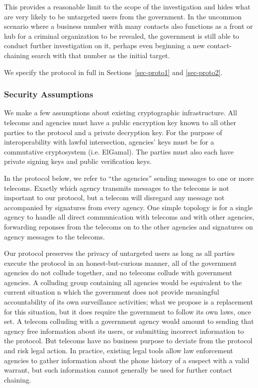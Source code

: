 This provides a reasonable limit to the scope of the investigation and hides what are very likely to be untargeted users from the government. In the uncommon scenario where a business number with many contacts also functions as a front or hub for a criminal organization to be revealed, the government is still able to conduct further investigation on it, perhaps even beginning a new contact-chaining search with that number as the initial target.

We specify the protocol in full in Sections~\ref{sec-proto1} and \ref{sec-proto2}.



\subsubsection{Security Assumptions}



We make a few assumptions about existing cryptographic infrastructure. All telecoms and agencies must have a public encryption key known to all other parties to the protocol and a private decryption key. For the purpose of interoperability with lawful intersection, agencies' keys must be for a commutative cryptosystem (i.e. ElGamal). The parties must also each have private signing keys and public verification keys.



In the protocol below, we refer to ``the agencies'' sending messages to one or more telecoms. Exactly which agency transmits messages to the telecoms is not important to our protocol, but a telecom will disregard any message not accompanied by signatures from every agency. One simple topology is for a single agency to handle all direct communication with telecoms and with other agencies, forwarding reponses from the telecoms on to the other agencies and signatures on agency messages to the telecoms.



Our protocol preserves the privacy of untargeted users as long as all parties execute the protocol in an honest-but-curious manner, all of the government agencies do not collude together, and no telecoms collude with government agencies. A colluding group containing all agencies would be equivalent to the current situation n which the government does not provide meaningful accountability of its own surveillance activities; what we propose is a replacement for this situation, but it does require the government to follow its own laws, once set. A telecom colluding with a government agency would amount to sending that agency free information about its users, or submitting incorrect information to the protocol. But telecoms have no business purpose to deviate from the protocol and risk legal action. In practice, existing legal tools allow law enforcement agencies to gather information about the phone history of a suspect with a valid warrant, but such information cannot generally be used for further contact chaining.

